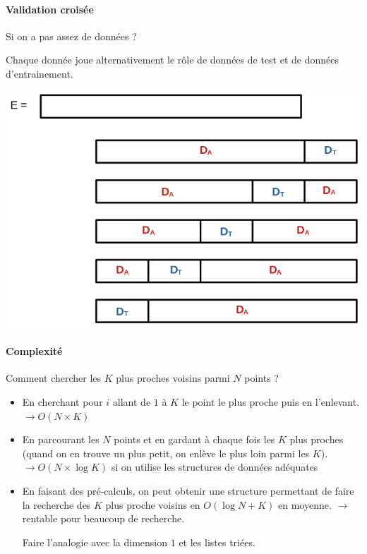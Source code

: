 \paragraph{Validation croisée} Si on a pas assez de données ?
\begin{com}
	Chaque donnée joue alternativement le rôle de données de test et de données d'entrainement.
\end{com}
\includegraphics[scale=0.4]{Developpements/k voisins/validation_croisee.png}


\paragraph{Complexité} Comment chercher les $K$ plus proches voisins parmi $N$ points ?
	\begin{itemize}[label=$\bullet$]
		\item En cherchant pour $i$ allant de $1$ à $K$ le point le plus proche puis en l'enlevant.
			\\ $\to O(N\times K)$ 
		\item En parcourant les $N$ points et en gardant à chaque fois les $K$ plus proches (quand on en trouve un plus petit, on enlève le plus loin parmi les $K$).
			\\ $\to O(N \times \log K)$ si on utilise les structures de données adéquates
		\item En faisant des pré-calculs, on peut obtenir une structure permettant de faire la recherche des $K$ plus proche voisins en $O(\log N + K)$ en moyenne. $\to$ rentable pour beaucoup de recherche.
		\begin{com}
			Faire l'analogie avec la dimension $1$ et les listes triées.
		\end{com}
	\end{itemize}

